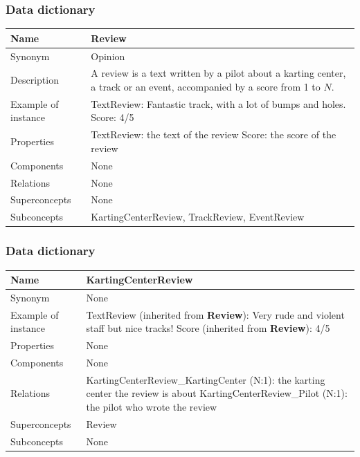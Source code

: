 \documentclass{beamer}
\begin{document}
\begin{frame}
    \frametitle{Data dictionary}
    \begin{table}
    \tiny
    \begin{tabular}{|p{2cm}|p{6cm}|}
    \hline
    Name & \textbf{Review} \\
    \hline
    Synonym & Opinion \\
    \hline
    Description & A review is a text written by a pilot about a karting center, a track or an event,
    accompanied by a score from 1 to $N$. \\
    \hline
    Example of instance &
    TextReview: Fantastic track, with a lot of bumps and holes. \newline
    Score: 4/5 \\
    \hline
    Properties &
    TextReview: the text of the review \newline
    Score: the score of the review \\
    \hline
    Components & None \\
    \hline
    Relations & None \\
    \hline
    Superconcepts & None \\
    \hline
    Subconcepts & KartingCenterReview, TrackReview, EventReview \\
    \hline
    \end{tabular}
    \end{table}
\end{frame}

\begin{frame}
    \frametitle{Data dictionary}
    \begin{table}
    \tiny
    \begin{tabular}{|p{2cm}|p{6cm}|}
    \hline
    Name & \textbf{KartingCenterReview} \\
    \hline
    Synonym & None \\
    \hline
    Example of instance &
    TextReview (inherited from \textbf{Review}): Very rude and violent staff but nice tracks! \newline
    Score (inherited from \textbf{Review}): 4/5 \\
    \hline
    Properties & None \\
    \hline
    Components & None \\
    \hline
    Relations &
    KartingCenterReview\_KartingCenter (N:1): the karting center the review is about \newline
    KartingCenterReview\_Pilot (N:1): the pilot who wrote the review \\
    \hline
    Superconcepts & Review \\
    \hline
    Subconcepts & None \\
    \hline
    \end{tabular}
    \end{table}
\end{frame}
\end{document}
